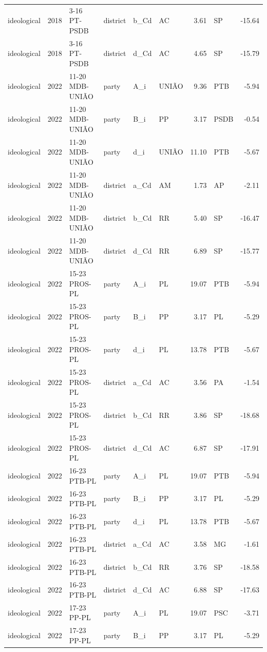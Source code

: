 \begin{landscape}
\begin{longtable}{lllL{2.2cm}lL{3.0cm}rL{3.0cm}r}
ideological & 2018 & 3-16 PT-PSDB & district & b\_Cd & AC & 3.61 & SP & -15.64 \\
ideological & 2018 & 3-16 PT-PSDB & district & d\_Cd & AC & 4.65 & SP & -15.79 \\
ideological & 2022 & 11-20 MDB-UNIÃO & party & A\_i & UNIÃO & 9.36 & PTB & -5.94 \\
ideological & 2022 & 11-20 MDB-UNIÃO & party & B\_i & PP & 3.17 & PSDB & -0.54 \\
ideological & 2022 & 11-20 MDB-UNIÃO & party & d\_i & UNIÃO & 11.10 & PTB & -5.67 \\
ideological & 2022 & 11-20 MDB-UNIÃO & district & a\_Cd & AM & 1.73 & AP & -2.11 \\
ideological & 2022 & 11-20 MDB-UNIÃO & district & b\_Cd & RR & 5.40 & SP & -16.47 \\
ideological & 2022 & 11-20 MDB-UNIÃO & district & d\_Cd & RR & 6.89 & SP & -15.77 \\
ideological & 2022 & 15-23 PROS-PL & party & A\_i & PL & 19.07 & PTB & -5.94 \\
ideological & 2022 & 15-23 PROS-PL & party & B\_i & PP & 3.17 & PL & -5.29 \\
ideological & 2022 & 15-23 PROS-PL & party & d\_i & PL & 13.78 & PTB & -5.67 \\
ideological & 2022 & 15-23 PROS-PL & district & a\_Cd & AC & 3.56 & PA & -1.54 \\
ideological & 2022 & 15-23 PROS-PL & district & b\_Cd & RR & 3.86 & SP & -18.68 \\
ideological & 2022 & 15-23 PROS-PL & district & d\_Cd & AC & 6.87 & SP & -17.91 \\
ideological & 2022 & 16-23 PTB-PL & party & A\_i & PL & 19.07 & PTB & -5.94 \\
ideological & 2022 & 16-23 PTB-PL & party & B\_i & PP & 3.17 & PL & -5.29 \\
ideological & 2022 & 16-23 PTB-PL & party & d\_i & PL & 13.78 & PTB & -5.67 \\
ideological & 2022 & 16-23 PTB-PL & district & a\_Cd & AC & 3.58 & MG & -1.61 \\
ideological & 2022 & 16-23 PTB-PL & district & b\_Cd & RR & 3.76 & SP & -18.58 \\
ideological & 2022 & 16-23 PTB-PL & district & d\_Cd & AC & 6.88 & SP & -17.63 \\
ideological & 2022 & 17-23 PP-PL & party & A\_i & PL & 19.07 & PSC & -3.71 \\
ideological & 2022 & 17-23 PP-PL & party & B\_i & PP & 3.17 & PL & -5.29 \\

\end{longtable}
\end{landscape}
